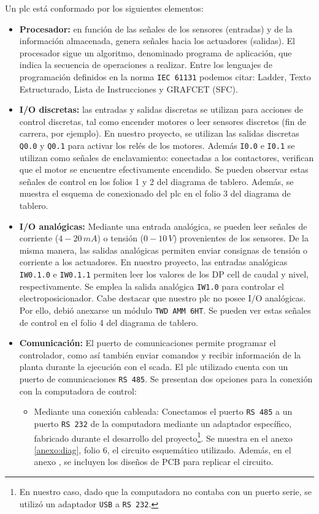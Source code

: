 Un \gls{plc} está conformado por los siguientes elementos:
\begin{itemize}
 \item \textbf{Procesador:} en función de las señales de los sensores
(entradas) y de la información almacenada, genera señales hacia los actuadores
(salidas).
El procesador sigue un algoritmo, denominado programa de aplicación,
que indica la secuencia de operaciones a realizar.
Entre los lenguajes de programación definidos en la norma \verb|IEC 61131|
podemos citar: Ladder, Texto Estructurado, Lista de Instrucciones y GRAFCET
(SFC).
 \item \textbf{I/O discretas:} las entradas y salidas discretas se
utilizan para acciones de control discretas, tal como encender motores
o leer sensores discretos (fin de carrera, por ejemplo).
En nuestro proyecto, se utilizan las salidas discretas \verb|Q0.0| y \verb|Q0.1|
para activar los relés de los motores.
Además \verb|I0.0| e \verb|I0.1| se
utilizan como señales de enclavamiento: conectadas a los contactores, verifican
que el motor se encuentre efectivamente encendido.
Se pueden observar estas señales de control en los folios 1 y 2 del diagrama de
tablero.
Además, se muestra el esquema de conexionado del \gls{plc} en el folio
3 del diagrama de tablero.
\item \textbf{I/O analógicas:}  Mediante una entrada
analógica, se pueden leer
señales de corriente ($4-20\,mA$) o tensión ($0-10\,V$) provenientes de los
sensores.
De la misma manera, las salidas analógicas permiten enviar consignas
de tensión o corriente a los actuadores.
En nuestro proyecto, las entradas analógicas \verb|IW0.1.0| e \verb|IW0.1.1|
permiten leer los valores de los DP cell de caudal y nivel, respectivamente.
Se emplea la salida analógica \verb|IW1.0| para controlar el
electroposicionador.
Cabe destacar que nuestro \gls{plc} no posee I/O analógicas.
Por ello, debió anexarse un módulo \verb|TWD AMM 6HT|.
Se pueden ver estas señales de control en el folio 4 del diagrama de tablero.

\item \textbf{Comunicación:} El puerto de comunicaciones permite programar el 
controlador, como así también enviar comandos y recibir información de
la planta durante la ejecución con el \gls{scada}.
El \gls{plc} utilizado cuenta con un puerto de comunicaciones \verb|RS 485|.
Se presentan dos opciones para la conexión con la computadora de control:
\begin{itemize}
 \item Mediante una conexión cableada:
 Conectamos el puerto \verb|RS 485| a un puerto \verb|RS 232| de la computadora
mediante un adaptador específico, fabricado durante el desarrollo del
proyecto\footnote{En nuestro caso, dado que la computadora no contaba con un
puerto serie, se utilizó un adaptador
\texttt{USB} a \texttt{RS 232}.}.
Se muestra en el anexo \ref{anexo:diag}, folio 6, el circuito esquemático
utilizado.
Además, en el anexo , se incluyen los diseños de PCB
para replicar el circuito.


\end{itemize}
\end{itemize}
